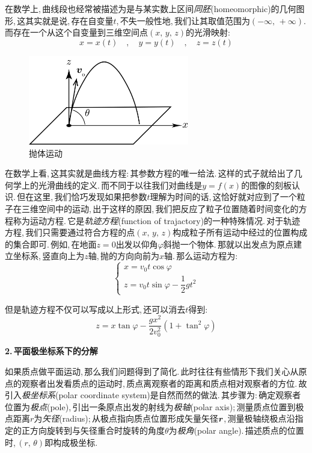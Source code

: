 在数学上,\,曲线段也经常被描述为是与某实数上区间\emph{同胚}(homeomorphic)的几何图形,\,这其实就是说,\,存在自变量$t$,\,不失一般性地,\,我们让其取值范围为$(-\infty,\,+\infty)$.\,而存在一个从这个自变量到三维空间点$(x,\,y,\,z)$的光滑映射:
\[x=x(t)\quad ,\quad y=y(t)\quad ,\quad z=z(t)\]

\begin{figure}\label{6-1-4}
\vspace{-0.4cm}
\centering
\includegraphics[width=7cm]{image/6-1-4.png}
\caption{抛体运动}
\end{figure}
在数学上看,\,这其实就是曲线方程:\,其参数方程的唯一给法.\,这样的式子就给出了几何学上的光滑曲线的定义.\,而不同于以往我们对曲线是$y=f(x)$的图像的刻板认识.\,但在这里,\,我们恰巧发现如果把参数$t$理解为时间的话,\,这恰好就对应到了一个粒子在三维空间中的运动,\,出于这样的原因,\,我们把反应了粒子位置随着时间变化的方程称为运动方程.\,它是\emph{轨迹方程}(function of trajactory)的一种特殊情况.\,对于轨迹方程,\,我们只需要通过符合方程的点$(x,\,y,\,z)$构成粒子所有运动中经过的位置构成的集合即可.\,例如,\,在地面$z=0$出发以仰角$\varphi$斜抛一个物体.\,那就以出发点为原点建立坐标系,\,竖直向上为$z$轴,\,抛的方向向前为$x$轴.\,那么运动方程为:
\[\left\{\begin{array}{l} x=v_0 t\cos\varphi\\ z=v_0 t\sin\varphi - \dfrac{1}{2}gt^2\end{array}\right.\]

但是轨迹方程不仅可以写成以上形式,\,还可以消去$t$得到:
\[z=x\tan\varphi -\frac{gx^2}{2v_0^2}(1+\tan^2\varphi)\]

\vspace{0.2cm}
{\bf 2.\,平面极坐标系下的分解}

如果质点做平面运动,\,那么我们问题得到了简化.\,此时往往有些情形下我们关心从原点的观察者出发看质点的运动时,\,质点离观察者的距离和质点相对观察者的方位.\,故引入\emph{极坐标系}(polar coordinate system)是自然而然的做法.\,其步骤为:\,确定观察者位置为\emph{极点}(pole),\,引出一条原点出发的射线为\emph{极轴}(polar axis);\,测量质点位置到极点距离$r$为\emph{矢径}(radius);\,从极点指向质点位置形成矢量矢径$\boldsymbol{r}$,\,测量极轴绕极点沿指定的正方向旋转到与矢径重合时旋转的角度$\theta$为\emph{极角}(polar angle).\,描述质点的位置时,\,$(r,\,\theta)$即构成极坐标.

